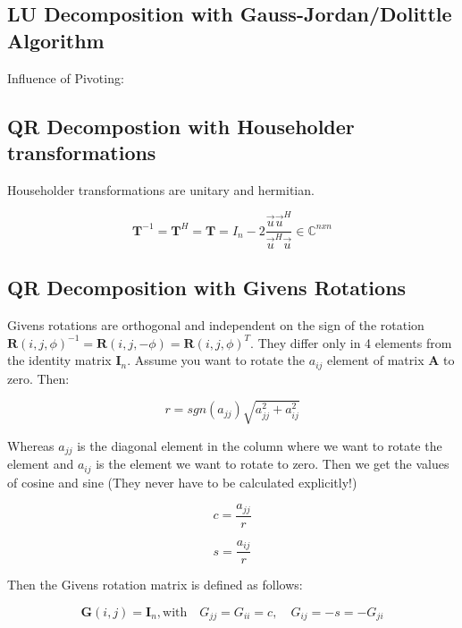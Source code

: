 \documentclass[
    a4paper,
    11pt
]{article}
\begin{document}
\subsection{LU Decomposition with Gauss-Jordan/Dolittle Algorithm}

Influence of Pivoting:

\subsection{QR Decompostion with Householder transformations}

Householder transformations are unitary and hermitian.

\begin{equation}
    \mathbf{T}^{-1} = \mathbf{T}^H = \mathbf{T} = I_n - 2
    \frac{\vec{u}\vec{u}^H}{\vec{u}^H\vec{u}} \in \mathbb{C}^{n x n}
\end{equation}

\subsection{QR Decomposition with Givens Rotations}

Givens rotations are orthogonal and independent on the sign of the
rotation $\mathbf{R}(i,j,\phi)^{-1} = \mathbf{R}(i,j, -\phi) = \mathbf{R}(i,j,
\phi)^{T}$. They differ only in 4 elements from the identity matrix
$\mathbf{I}_n$. Assume you want to rotate the $a_{ij}$ element of matrix
$\mathbf{A}$ to zero. Then:

\begin{equation}
    r = sgn(a_{jj}) \sqrt{a_{jj}^2 + a_{ij}^2}
\end{equation}

Whereas $a_{jj}$ is the diagonal element in the column where we want to rotate
the element and $a_{ij}$ is the element we want to rotate to zero. Then we get
the values of cosine and sine (They never have to be calculated explicitly!)

\begin{equation}
    c = \frac{a_{jj}}{r}
\end{equation}

\begin{equation}
    s = \frac{a_{ij}}{r}
\end{equation}

Then the Givens rotation matrix is defined as follows:

\begin{equation}
    \mathbf{G}(i, j) = \mathbf{I}_n, \text{with} \quad
    G_{jj} = G_{ii} = c, \quad G_{ij} = -s = -G_{ji}
\end{equation}
\end{document}
